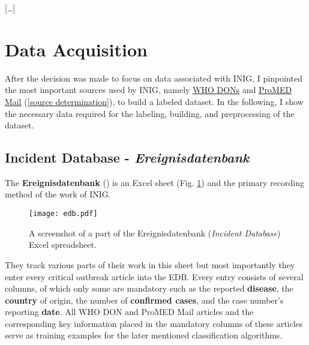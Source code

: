 

  [\dots]

\section{Data Acquisition}
  After the decision was made to focus on data associated with INIG, I pinpointed the most important sources used by INIG, namely \href{https://www.who.int/csr/don/en/}{WHO DONs} and \href{https://www.promedmail.org}{ProMED Mail} (\ref{source determination}), to build a labeled dataset.
  In the following, I show the necessary data required for the labeling, building, and preprocessing of the dataset.

\subsection{Incident Database - \textit{Ereignisdatenbank}}
  The \textbf{Ereignisdatenbank} () is an Excel sheet (Fig. \ref{fig:edb_pic}) and the primary recording method of the work of INIG.
  \begin{figure}[h!]
    \centering
    \texttt{[image: edb.pdf]}
    \caption{A screenshot of a part of the Ereignisdatenbank (\textit{Incident Database}) Excel spreadsheet.}
  \label{fig:edb_pic}
  \end{figure}
  They track various parts of their work in this sheet but most importantly they enter every critical outbreak article into the EDB.
  Every entry consists of several columns, of which only some are mandatory such as the reported \textbf{disease}, the \textbf{country} of origin, the number of \textbf{confirmed cases}, and the case number's reporting \textbf{date}.
  All WHO DON and ProMED Mail articles and the corresponding key information placed in the mandatory columns of these articles serve as training examples for the later mentioned classification algorithms.


